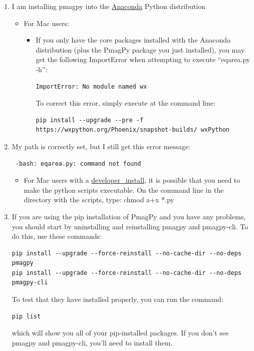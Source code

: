 \documentclass[11pt]{book}
\begin{document}
{{{\begin{enumerate}
\begin{itemize}
Second, if you are trying to get a developer install to work on Windows, and you want to set/check your \$PATH manually, see \href{http://www.mathworks.com/matlabcentral/answers/94933-how-do-i-set-my-system-path-under-windows}{Setting your Path in Windows}.


\end {itemize}

\item I am installing pmagpy into the \href{https://www.continuum.io/downloads}{Anaconda} Python distribution

\begin{itemize}
\item For Mac users:
\begin{itemize}
\item If you only have the core packages installed with the Anaconda distribution (plus the PmagPy package you just installed), you may get the following ImportError when attempting to execute ``eqarea.py -h'':

\begin{verbatim}
ImportError: No module named wx
\end{verbatim}

To correct this error, simply execute at the command line:
\begin{verbatim}
pip install --upgrade --pre -f https://wxpython.org/Phoenix/snapshot-builds/ wxPython
\end{verbatim}
\end{itemize}
\end{itemize}

\item  My path is correctly set, but I still get this error message: \begin{verbatim} -bash: eqarea.py: command not found
\end{verbatim}

  \begin{itemize}
  \item  For Mac users with a \href{#developer_install}{developer_install}, it is possible that you need to make the python scripts executable. On the command line in the directory with the scripts, type: chmod a+x *.py
  \end{itemize}

\item
  If you are using the pip installation of PmagPy and you have any problems, you should start by uninstalling and reinstalling pmagpy and pmagpy-cli.  To do this, use these commands:
\begin{verbatim}
pip install --upgrade --force-reinstall --no-cache-dir --no-deps pmagpy
pip install --upgrade --force-reinstall --no-cache-dir --no-deps pmagpy-cli
\end{verbatim}
To test that they have installed properly, you can run the command:
\begin{verbatim}
pip list
\end{verbatim}
which will show you all of your pip-installed packages.  If you don't see pmagpy and pmagpy-cli, you'll need to install them.


\end{enumerate}}}}
\end{document}

